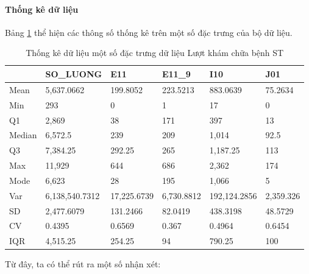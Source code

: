     \paragraph{Thống kê dữ liệu}
        \leavevmode

    Bảng \ref{tab:stat-yte} thể hiện các thông số thống kê trên một số đặc trưng của bộ dữ liệu.

    \begin{table}[htbp]
    \centering
    \caption{ Thống kê dữ liệu một số đặc trưng dữ liệu Lượt khám chữa bệnh ST}
    \label{tab:stat-yte}
    \begin{tabular}{|l|l|l|l|l|l|}
    \hline
      & SO\_LUONG & E11 & E11\_9 & I10 & J01 \\
    \hline
    Mean & 5,637.0662 & 199.8052 & 223.5213 & 883.0639 & 75.2634 \\
    \hline
    Min & 293 & 0 & 1 & 17 & 0 \\
    \hline
    Q1 & 2,869 & 38 & 171 & 397 & 13 \\
    \hline
    Median & 6,572.5 & 239 & 209 & 1,014 & 92.5 \\
    \hline
    Q3 & 7,384.25 & 292.25 & 265 & 1,187.25 & 113 \\
    \hline
    Max & 11,929 & 644 & 686 & 2,362 & 174 \\
    \hline
    Mode & 6,623 & 28 & 195 & 1,066 & 5 \\
    \hline
    Var & 6,138,540.7312 & 17,225.6739 & 6,730.8812 & 192,124.2856 & 2,359.326 \\
    \hline
    SD & 2,477.6079 & 131.2466 & 82.0419 & 438.3198 & 48.5729 \\
    \hline
    CV & 0.4395 & 0.6569 & 0.367 & 0.4964 & 0.6454 \\
    \hline
    IQR & 4,515.25 & 254.25 & 94 & 790.25 & 100 \\
    \hline
    \end{tabular}

    \end{table}

    Từ đây, ta có thể rút ra một số nhận xét:

